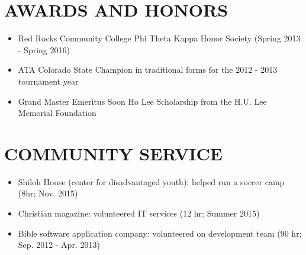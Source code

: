 \documentclass[10.5pt,letterpaper]{article}
\begin{document}
\section*{AWARDS AND HONORS}
\begin{itemize}
    \item Red Rocks Community College Phi Theta Kappa Honor Society (Spring 2013 - Spring 2016)
    \item ATA Colorado State Champion in traditional forms for the 2012 - 2013 tournament year
    \item Grand Master Emeritus Soon Ho Lee Scholarship from the H.U. Lee Memorial Foundation
\end{itemize}

\section*{COMMUNITY SERVICE}
\begin{itemize}
    \item Shiloh House (center for disadvantaged youth): helped run a soccer camp (8hr; Nov. 2015)
    \item Christian magazine: volunteered IT services (12 hr; Summer 2015)
    \item Bible software application company: volunteered on development team (90 hr; Sep. 2012 -
        Apr. 2013)
\end{itemize}
\end{document}
